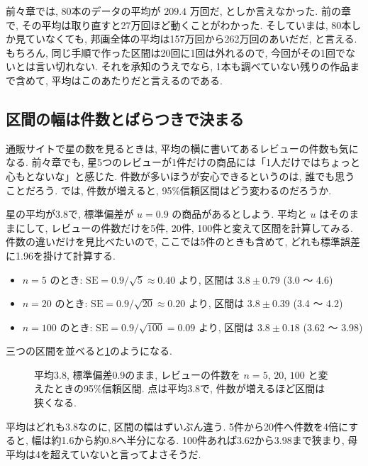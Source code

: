     前々章では, 80本のデータの平均が $209.4$ 万回だ, としか言えなかった.
    前の章で, その平均は取り直すと27万回ほど動くことがわかった.
    そしていまは, 80本しか見ていなくても, 邦画全体の平均は157万回から262万回のあいだだ, と言える.
    もちろん, 同じ手順で作った区間は20回に1回は外れるので, 今回がその1回でないとは言い切れない.
    それを承知のうえでなら, 1本も調べていない残りの作品まで含めて, 平均はこのあたりだと言えるのである.

  \subsection{区間の幅は件数とばらつきで決まる}

    通販サイトで星の数を見るときは, 平均の横に書いてあるレビューの件数も気になる.
    前々章でも, 星5つのレビューが1件だけの商品には「1人だけではちょっと心もとないな」と感じた.
    件数が多いほうが安心できるというのは, 誰でも思うことだろう.
    では, 件数が増えると, 95\%信頼区間はどう変わるのだろうか.

    星の平均が3.8で, 標準偏差が $u = 0.9$ の商品があるとしよう.
    平均と $u$ はそのままにして, レビューの件数だけを5件, 20件, 100件と変えて区間を計算してみる.
    件数の違いだけを見比べたいので, ここでは5件のときも含めて, どれも標準誤差に1.96を掛けて計算する.

    \begin{itemize}
      \item $n = 5$ のとき: $\mathrm{SE} = 0.9 / \sqrt{5} \approx 0.40$ より, 区間は $3.8 \pm 0.79$ (3.0 〜 4.6)
      \item $n = 20$ のとき: $\mathrm{SE} = 0.9 / \sqrt{20} \approx 0.20$ より, 区間は $3.8 \pm 0.39$ (3.4 〜 4.2)
      \item $n = 100$ のとき: $\mathrm{SE} = 0.9 / \sqrt{100} = 0.09$ より, 区間は $3.8 \pm 0.18$ (3.62 〜 3.98)
    \end{itemize}

    三つの区間を並べると\cref{fig:ch04-ci-n}のようになる.

    \begin{figure}[htbp]
      \centering
      
      \caption{平均3.8, 標準偏差0.9のまま, レビューの件数を $n = 5$, $20$, $100$ と変えたときの95\%信頼区間. 点は平均3.8で, 件数が増えるほど区間は狭くなる.}
      \label{fig:ch04-ci-n}
    \end{figure}

    平均はどれも3.8なのに, 区間の幅はずいぶん違う.
    5件から20件へ件数を4倍にすると, 幅は約1.6から約0.8へ半分になる.
    100件あれば3.62から3.98まで狭まり, 母平均は4を超えていないと言ってよさそうだ.

